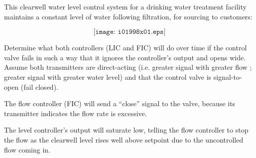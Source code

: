 

This clearwell water level control system for a drinking water treatment facility maintains a constant level of water following filtration, for sourcing to customers:

$$\texttt{[image: i01998x01.eps]}$$

Determine what both controllers (LIC and FIC) will do over time if the control valve fails in such a way that it ignores the controller's output and opens wide.  Assume both transmitters are direct-acting (i.e. greater signal with greater flow ; greater signal with greater water level) and that the control valve is signal-to-open (fail closed).







The flow controller (FIC) will send a ``close'' signal to the valve, because its transmitter indicates the flow rate is excessive. 

\vskip 10pt

The level controller's output will saturate low, telling the flow controller to stop the flow as the clearwell level rises well above setpoint due to the uncontrolled flow coming in. 











